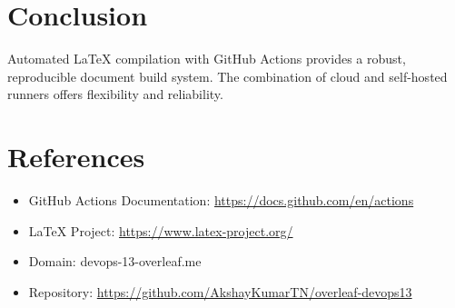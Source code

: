 \documentclass{article}
\begin{document}
\section{Conclusion}
Automated LaTeX compilation with GitHub Actions provides a robust, reproducible document build system. The combination of cloud and self-hosted runners offers flexibility and reliability.

\section{References}
\begin{itemize}
    \item GitHub Actions Documentation: \url{https://docs.github.com/en/actions}
    \item LaTeX Project: \url{https://www.latex-project.org/}
    \item Domain: devops-13-overleaf.me
    \item Repository: \url{https://github.com/AkshayKumarTN/overleaf-devops13}
\end{itemize}
\end{document}
